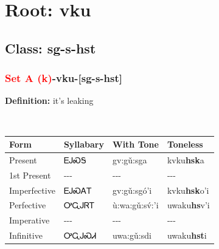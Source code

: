 \needspace{4in}
\section*{Root: vku}
\nopagebreak
{}
\needspace{3in}
\subsection*{Class: sg-s-hst}
\nopagebreak
\needspace{2in}
\subsubsection*{\textcolor{Red}{Set A (k)}{-}\textbf{vku}{-}[sg-s-hst]}
\nopagebreak
\textbf{Definition: } it{\textquoteright}s leaking
\\[0.5em]
\begin{tabularx}{\textwidth}{l X X X}%
\toprule%
\textbf{Form}&\textbf{Syllabary}&\textbf{With Tone}&\textbf{Toneless}\\%
\midrule%
Present&ᎬᎫᏍᎦ&gv:gǔ:sga&kvku\textbf{hsk}a\\%
1st Present&{-}{-}{-}&{-}{-}{-}&{-}{-}{-}\\%
Imperfective&ᎬᎫᏍᎪᎢ&gv:gǔ:sgó’i&kvku\textbf{hsk}o'i\\%
Perfective&ᎤᏩᎫᏒᎢ&ù:wa:gǔ:sv́:’i&uwaku\textbf{hs}v'i\\%
Imperative&{-}{-}{-}&{-}{-}{-}&{-}{-}{-}\\%
Infinitive&ᎤᏩᎫᏍᏗ&uwa:gǔ:sdi&uwaku\textbf{hst}i\\%
\bottomrule%
\end{tabularx}
\\[1em]